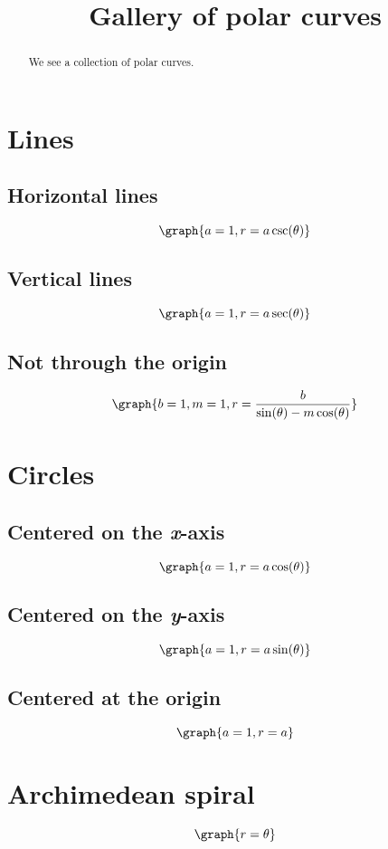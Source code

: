 \documentclass{ximera}
\title[Dig-In:]{Gallery of polar curves}
\begin{document}
\begin{abstract}
We see a collection of polar curves.
\end{abstract}
\maketitle

\section{Lines}

\subsection{Horizontal lines}
\[
\graph{a=1,r=a \csc(\theta)}
\]
\subsection{Vertical lines}
\[
\graph{a=1,r=a \sec(\theta)}
\]
\subsection{Not through the origin}
\[
\graph{b=1,m=1,r=\frac{b}{\sin(\theta)-m \cos(\theta)}}
\]

\section{Circles}

\subsection{Centered on the \textit{x}-axis}
\[
\graph{a=1, r=a \cos(\theta)}
\]

\subsection{Centered on the \textit{y}-axis}
\[
\graph{a=1,r=a \sin(\theta)}
\]

\subsection{Centered at the origin}
\[
\graph{a=1,r=a}
\]

\section{Archimedean spiral}
\[
\graph{r=\theta}
\]
\end{document}
